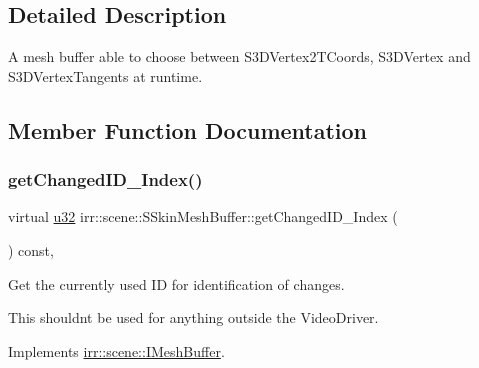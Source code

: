 \subsection{Detailed Description}
A mesh buffer able to choose between S3\+D\+Vertex2\+T\+Coords, S3\+D\+Vertex and S3\+D\+Vertex\+Tangents at runtime. 

\subsection{Member Function Documentation}
\mbox{\label{structirr_1_1scene_1_1SSkinMeshBuffer_a60b444cfe4b0cec6d2cc4bdf7958dd16}} 
\subsubsection{\texorpdfstring{get\+Changed\+I\+D\+\_\+\+Index()}{getChangedID\_Index()}}
{\footnotesize\ttfamily virtual \hyperlink{namespaceirr_a0416a53257075833e7002efd0a18e804}{u32} irr\+::scene\+::\+S\+Skin\+Mesh\+Buffer\+::get\+Changed\+I\+D\+\_\+\+Index (\begin{DoxyParamCaption}{ }\end{DoxyParamCaption}) const\hspace{0.3cm}{\ttfamily [inline]}, {\ttfamily [virtual]}}



Get the currently used ID for identification of changes. 

This shouldn\textquotesingle{}t be used for anything outside the Video\+Driver. 

Implements \hyperlink{classirr_1_1scene_1_1IMeshBuffer_acc389d76856dfb06c3ba45a92315e6d8}{irr\+::scene\+::\+I\+Mesh\+Buffer}.

\mbox{\label{structirr_1_1scene_1_1SSkinMeshBuffer_a94faa430425d73fbb6cab74ac65af1c1}} 
